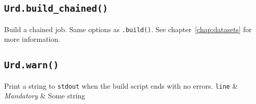 \subsection{\texttt{Urd.build\_chained()}}
Build a chained job.  Same options as \texttt{.build()}. See
chapter~\ref{chap:datasets} for more information.


\subsection{\texttt{Urd.warn()}}
Print a string to \texttt{stdout} when the build script ends with no
errors.
\starttable
\texttt{line} & \textsl{Mandatory} & Some string\\
\stoptable
